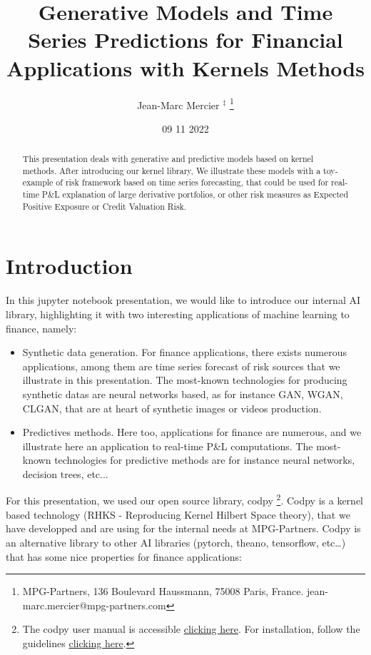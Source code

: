 \documentclass[
]{article}
\title{Generative Models and Time Series Predictions for Financial
Applications with Kernels Methods}
\author{Jean-Marc Mercier \(^\ddag\)
\footnote{MPG-Partners, 136 Boulevard Haussmann, 75008 Paris, France. jean-marc.mercier@mpg-partners.com}}
\date{09 11 2022}
\numberwithin{equation}{section}
\begin{document}
\maketitle
\begin{abstract}
This presentation deals with generative and predictive models based on
kernel methods. After introducing our kernel library, We illustrate
these models with a toy-example of risk framework based on time series
forecasting, that could be used for real-time P\&L explanation of large
derivative portfolios, or other risk measures as Expected Positive
Exposure or Credit Valuation Risk.
\end{abstract}

\hypertarget{introduction}{%
\section{Introduction}\label{introduction}}

In this jupyter notebook presentation, we would like to introduce our
internal AI library, highlighting it with two interesting applications
of machine learning to finance, namely:

\begin{itemize}
\item Synthetic data generation. For finance applications, there exists numerous applications, among them are time series forecast of risk sources that we illustrate in this presentation. The most-known technologies for producing synthetic datas are neural networks based, as for instance GAN, WGAN, CLGAN, that are at heart of synthetic images or videos production.
\item Predictives methods. Here too, applications for finance are numerous, and we illustrate here an application to real-time P\&L computations. The most-known technologies for predictive methods are for instance neural networks, decision trees, etc...
\end{itemize}

For this presentation, we used our open source library, codpy
\footnote{The codpy user manual is accessible 
\href{https://papers.ssrn.com/sol3/papers.cfm?abstract_id=4077158}{clicking here}. For installation, follow the guidelines \href{https://pypi.org/project/codpy/}{clicking here}.}.
Codpy is a kernel based technology (RHKS - Reproducing Kernel Hilbert
Space theory), that we have developped and are using for the internal
needs at MPG-Partners. Codpy is an alternative library to other AI
libraries (pytorch, theano, tensorflow, etc\ldots) that has some nice
properties for finance applications:
\end{document}
